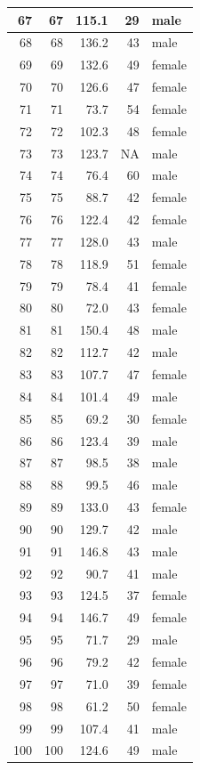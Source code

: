 \documentclass[]{svmono}
\begin{document}
\begin{tabular}{r|r|r|r|l}
\hline
67 & 67 & 115.1 & 29 & male\\
\hline
68 & 68 & 136.2 & 43 & male\\
\hline
69 & 69 & 132.6 & 49 & female\\
\hline
70 & 70 & 126.6 & 47 & female\\
\hline
71 & 71 & 73.7 & 54 & female\\
\hline
72 & 72 & 102.3 & 48 & female\\
\hline
73 & 73 & 123.7 & NA & male\\
\hline
74 & 74 & 76.4 & 60 & male\\
\hline
75 & 75 & 88.7 & 42 & female\\
\hline
76 & 76 & 122.4 & 42 & female\\
\hline
77 & 77 & 128.0 & 43 & male\\
\hline
78 & 78 & 118.9 & 51 & female\\
\hline
79 & 79 & 78.4 & 41 & female\\
\hline
80 & 80 & 72.0 & 43 & female\\
\hline
81 & 81 & 150.4 & 48 & male\\
\hline
82 & 82 & 112.7 & 42 & male\\
\hline
83 & 83 & 107.7 & 47 & female\\
\hline
84 & 84 & 101.4 & 49 & male\\
\hline
85 & 85 & 69.2 & 30 & female\\
\hline
86 & 86 & 123.4 & 39 & male\\
\hline
87 & 87 & 98.5 & 38 & male\\
\hline
88 & 88 & 99.5 & 46 & male\\
\hline
89 & 89 & 133.0 & 43 & female\\
\hline
90 & 90 & 129.7 & 42 & male\\
\hline
91 & 91 & 146.8 & 43 & male\\
\hline
92 & 92 & 90.7 & 41 & male\\
\hline
93 & 93 & 124.5 & 37 & female\\
\hline
94 & 94 & 146.7 & 49 & female\\
\hline
95 & 95 & 71.7 & 29 & male\\
\hline
96 & 96 & 79.2 & 42 & female\\
\hline
97 & 97 & 71.0 & 39 & female\\
\hline
98 & 98 & 61.2 & 50 & female\\
\hline
99 & 99 & 107.4 & 41 & male\\
\hline
100 & 100 & 124.6 & 49 & male\\
\hline
\end{tabular}
\end{document}
